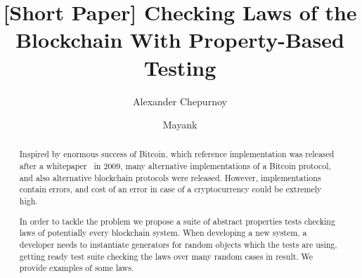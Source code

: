 \documentclass[]{llncs}   %
\begin{document}
\title{[Short Paper] Checking Laws of the Blockchain With Property-Based Testing}

\author{Alexander Chepurnoy \and Mayank}
\maketitle

\begin{abstract}
Inspired by enormous success of Bitcoin, which reference implementation was released after a whitepaper~\cite{Nakamoto2008} in 2009, many alternative implementations of a Bitcoin protocol, and also alternative blockchain protocols were released. However, implementations contain errors, and cost of an error in case of a cryptocurrency could be extremely high. 

In order to tackle the problem we propose a suite of abstract properties tests checking laws of potentially every blockchain system. 
When developing a new system, a developer needs to instantiate generators for random objects which the tests are using, getting ready test suite checking the laws over many random cases in result. We provide examples of some laws.
\end{abstract}














\newpage
\appendix


\end{document}
